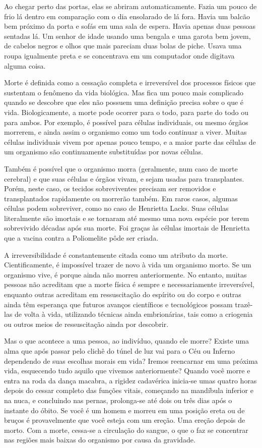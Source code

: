 Ao chegar perto das portas, elas se abriram automaticamente. Fazia um pouco de frio lá dentro em comparação com o dia ensolarado de lá fora. Havia um balcão bem próximo da porta e sofás em uma sala de espera. Havia apenas duas pessoas sentadas lá. Um senhor de idade usando uma bengala e uma garota bem jovem, de cabelos negros e olhos que mais pareciam duas bolas de piche. Usava uma roupa igualmente preta e se concentrava em um computador onde digitava alguma coisa.

Morte é definida como a cessação completa e irreversível dos processos físicos que sustentam o fenômeno da vida biológica. Mas fica um pouco mais complicado quando se descobre que eles não possuem uma definição precisa sobre o que é vida. Biologicamente, a morte pode ocorrer para o todo, para parte do todo ou para ambos. Por exemplo, é possível para células individuais, ou mesmo órgãos morrerem, e ainda assim o organismo como um todo continuar a viver. Muitas células individuais vivem por apenas pouco tempo, e a maior parte das células de um organismo são continuamente substituídas por novas células.

Também é possível que o organismo morra (geralmente, num caso de morte cerebral) e que suas células e órgãos vivam, e sejam usadas para transplantes. Porém, neste caso, os tecidos sobreviventes precisam ser removidos e transplantados rapidamente ou morrerão também. Em raros casos, algumas células podem sobreviver, como no caso de Henrietta Lacks. Suas células literalmente são imortais e se tornaram até mesmo uma nova espécie por terem sobrevivido décadas após sua morte. Foi graças às células imortais de Henrietta que a vacina contra a Poliomelite pôde ser criada.

A irreversibilidade é constantemente citada como um atributo da morte. Cientificamente, é impossível trazer de novo à vida um organismo morto. Se um organismo vive, é porque ainda não morreu anteriormente. No entanto, muitas pessoas não acreditam que a morte física é sempre e necessariamente irreversível, enquanto outras acreditam em ressuscitação do espírito ou do corpo e outras ainda têm esperança que futuros avanços científicos e tecnológicos possam trazê-las de volta à vida, utilizando técnicas ainda embrionárias, tais como a criogenia ou outros meios de ressuscitação ainda por descobrir.

Mas o que acontece a uma pessoa, ao indivíduo, quando ele morre? Existe uma alma que após passar pelo clichê do túnel de luz vai para o Céu ou Inferno dependendo de suas escolhas morais em vida? Iremos reencarnar em uma próxima vida, esquecendo tudo aquilo que vivemos anteriormente? Quando você morre e entra na roda da dança macabra, a rigidez cadavérica inicia-se umas quatro horas depois do cessar completo das funções vitais, começando na mandíbula inferior e na nuca, e concluindo nas pernas, prolonga-se até dois ou três dias após o instante do óbito. Se você é um homem e morreu em uma posição ereta ou de bruços é provavelmente que você esteja com um ereção. Uma ereção depois de morto. Com a morte, cessa-se a circulação do sangue, o que o faz se concentrar nas regiões mais baixas do organismo por causa da gravidade.


